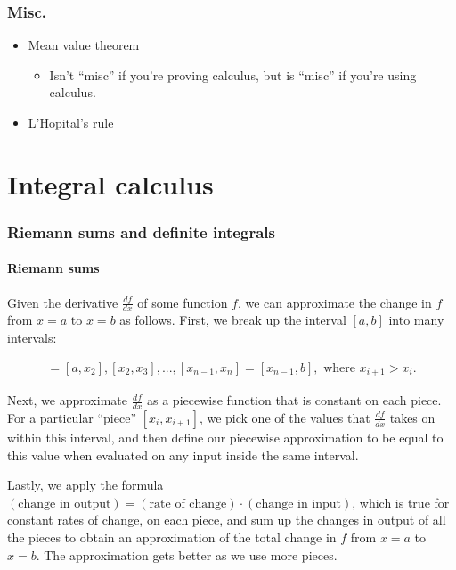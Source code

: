 \documentclass{article}
\begin{document}
\section*{Misc.}

\begin{itemize}
    \item Mean value theorem
    \begin{itemize}
        \item Isn't ``misc'' if you're proving calculus, but is ``misc'' if you're using calculus.
    \end{itemize}
    \item L'Hopital's rule
\end{itemize}

\newpage

\part*{Integral calculus}

\section*{Riemann sums and definite integrals}

\subsection*{Riemann sums}

Given the derivative $\frac{df}{dx}$ of some function $f$, we can approximate the change in $f$ from $x = a$ to $x = b$ as follows. First, we break up the interval $[a, b]$ into many intervals:

\begin{align*}
    [x_1, x_2] = [a, x_2], [x_2, x_3], ..., [x_{n - 1}, x_n] = [x_{n - 1}, b], \text{ where $x_{i + 1} > x_i$}.
\end{align*}

Next, we approximate $\frac{df}{dx}$ as a piecewise function that is constant on each piece. For a particular ``piece'' $[x_i, x_{i + 1}]$, we pick one of the values that $\frac{df}{dx}$ takes on within this interval, and then define our piecewise approximation to be equal to this value when evaluated on any input inside the same interval.

Lastly, we apply the formula $(\text{change in output}) = (\text{rate of change}) \cdot (\text{change in input})$, which is true for constant rates of change, on each piece, and sum up the changes in output of all the pieces to obtain an approximation of the total change in $f$ from $x = a$ to $x = b$. The approximation gets better as we use more pieces. 
\end{document}
